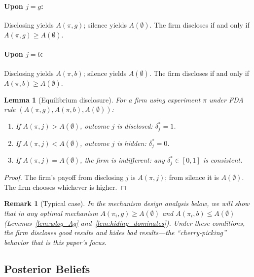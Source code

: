\documentclass[12pt,a4paper]{article}
\newtheorem{lemma}{Lemma}
\newtheorem{remark}{Remark}
\begin{document}
\paragraph{Upon $j = g$:}
Disclosing yields $A(\pi, g)$; silence yields $A(\emptyset)$.
The firm discloses if and only if
$A(\pi, g) \geq A(\emptyset)$.

\paragraph{Upon $j = b$:}
Disclosing yields $A(\pi, b)$; silence yields $A(\emptyset)$.
The firm discloses if and only if
$A(\pi, b) \geq A(\emptyset)$.

\begin{lemma}[Equilibrium disclosure]\label{lem:disclosure}
For a firm using experiment $\pi$ under FDA rule
$(A(\pi, g), A(\pi, b), A(\emptyset))$:
\begin{enumerate}
  \item[(i)] If $A(\pi, j) > A(\emptyset)$, outcome $j$ is
    disclosed: $\delta_j^* = 1$.
  \item[(ii)] If $A(\pi, j) < A(\emptyset)$, outcome $j$ is
    hidden: $\delta_j^* = 0$.
  \item[(iii)] If $A(\pi, j) = A(\emptyset)$, the firm is
    indifferent: any $\delta_j^* \in [0, 1]$ is consistent.
\end{enumerate}
\end{lemma}

\begin{proof}
The firm's payoff from disclosing $j$ is $A(\pi, j)$; from
silence it is $A(\emptyset)$. The firm chooses whichever is
higher.
\end{proof}

\begin{remark}[Typical case]
In the mechanism design analysis below, we will show that in
any optimal mechanism $A(\pi_i, g) \geq A(\emptyset)$ and
$A(\pi_i, b) \leq A(\emptyset)$
(Lemmas~\ref{lem:wlog_Ag} and~\ref{lem:hiding_dominates}).
Under these conditions, the firm discloses good results and
hides bad results---the ``cherry-picking'' behavior that is
this paper's focus.
\end{remark}


\subsection{Posterior Beliefs}
\label{sec:posteriors}
\end{document}
